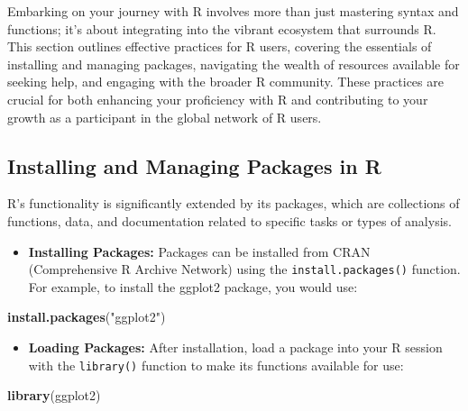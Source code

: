 \documentclass[
]{book}
\newenvironment{Shaded}{\begin{snugshade}}{\end{snugshade}}
\newcommand{\FunctionTok}[1]{\textcolor[rgb]{0.13,0.29,0.53}{\textbf{#1}}}
\newcommand{\NormalTok}[1]{#1}
\newcommand{\StringTok}[1]{\textcolor[rgb]{0.31,0.60,0.02}{#1}}
\providecommand{\tightlist}{%
  \setlength{\itemsep}{0pt}\setlength{\parskip}{0pt}}
\begin{document}
Embarking on your journey with R involves more than just mastering syntax and functions; it's about integrating into the vibrant ecosystem that surrounds R. This section outlines effective practices for R users, covering the essentials of installing and managing packages, navigating the wealth of resources available for seeking help, and engaging with the broader R community. These practices are crucial for both enhancing your proficiency with R and contributing to your growth as a participant in the global network of R users.

\hypertarget{installing-and-managing-packages-in-r}{%
\subsection*{Installing and Managing Packages in R}\label{installing-and-managing-packages-in-r}}

R's functionality is significantly extended by its packages, which are collections of functions, data, and documentation related to specific tasks or types of analysis.

\begin{itemize}
\tightlist
\item
  \textbf{Installing Packages:} Packages can be installed from CRAN (Comprehensive R Archive Network) using the \texttt{install.packages()} function. For example, to install the ggplot2 package, you would use:
\end{itemize}

\begin{Shaded}
\begin{Highlighting}[]
\FunctionTok{install.packages}\NormalTok{(}\StringTok{"ggplot2"}\NormalTok{)}
\end{Highlighting}
\end{Shaded}

\begin{itemize}
\tightlist
\item
  \textbf{Loading Packages:} After installation, load a package into your R session with the \texttt{library()} function to make its functions available for use:
\end{itemize}

\begin{Shaded}
\begin{Highlighting}[]
\FunctionTok{library}\NormalTok{(ggplot2)}
\end{Highlighting}
\end{Shaded}
\end{document}
